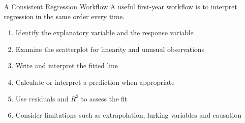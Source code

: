 \documentclass[aspectratio=169]{beamer}
\begin{document}
\begin{frame}{A Consistent Regression Workflow}
A useful first-year workflow is to interpret regression in the same order every time.
\begin{enumerate}
  \item Identify the explanatory variable and the response variable
  \item Examine the scatterplot for linearity and unusual observations
  \item Write and interpret the fitted line
  \item Calculate or interpret a prediction when appropriate
  \item Use residuals and $R^2$ to assess the fit
  \item Consider limitations such as extrapolation, lurking variables and causation
\end{enumerate}
\end{frame}
\end{document}
